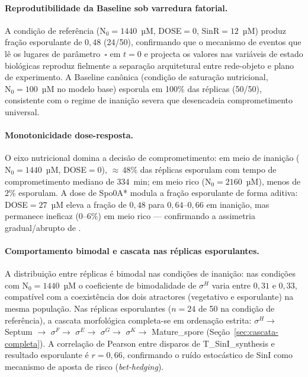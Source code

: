 \paragraph{Reprodutibilidade da Baseline sob varredura fatorial.}
A condição de referência ($\text{N}_0=1440$~µM, DOSE$=0$,
SinR$=12$~µM) produz fração esporulante de $0{,}48$ (24/50),
confirmando que o mecanismo de eventos que lê os lugares de
parâmetro~$\square$ em $t=0$ e projecta os valores nas variáveis de
estado biológicas reproduz fielmente a separação arquitetural entre
rede-objeto e plano de experimento.
A Baseline canônica (condição de saturação nutricional, $\text{N}_0=100$~µM
no modelo base) esporula em 100\% das réplicas (50/50), consistente
com o regime de inanição severa que desencadeia comprometimento universal.

\paragraph{Monotonicidade dose-resposta.}
O eixo nutricional domina a decisão de comprometimento: em meio de
inanição ($\text{N}_0=1440$~µM, DOSE$=0$), ${\approx}\,48\%$ das
réplicas esporulam com tempo de comprometimento mediano de $334$~min;
em meio rico ($\text{N}_0=2160$~µM), menos de $2\%$ esporulam.
A dose de Spo0A* modula a fração esporulante de forma aditiva: DOSE$=27$~µM
eleva a fração de $0{,}48$ para $0{,}64$--$0{,}66$ em inanição, mas
permanece ineficaz ($0$--$6\%$) em meio rico --- confirmando a
assimetria gradual/abrupto de \textcite{Fujita2005}.

\paragraph{Comportamento bimodal e cascata nas réplicas esporulantes.}
A distribuição entre réplicas é bimodal nas condições de inanição: nas
condições com $\text{N}_0=1440$~µM o coeficiente de bimodalidade de
$\sigma^H$ varia entre $0{,}31$ e $0{,}33$, compatível com a coexistência
dos dois atractores (vegetativo e esporulante) na mesma população.
Nas réplicas esporulantes ($n=24$ de 50 na condição de referência), a
cascata morfológica completa-se em ordenação estrita: $\sigma^H \to$
Septum $\to$ $\sigma^F \to$ $\sigma^E \to$ $\sigma^G \to$ $\sigma^K \to$
Mature\_spore (Seção~\ref{sec:cascata-completa}).
A correlação de Pearson entre disparos de T\_SinI\_synthesis e resultado
esporulante é $r = 0{,}66$, confirmando o ruído estocástico de SinI como
mecanismo de aposta de risco (\textit{bet-hedging}).

